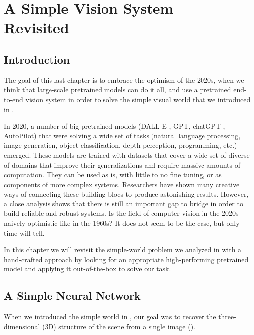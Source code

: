 %	
%	
%	 
%




\chapter{A Simple Vision System---Revisited}
\label{chap:simple_system_revisited}
\section{Introduction}
The goal of this last chapter is to embrace the optimism of the 2020s, when we think that large-scale pretrained models can do it all, and use a pretrained end-to-end vision system in order to solve the simple visual world that we introduced in \chap{\ref{chapter:simplesystem}}.

In 2020, a number of big pretrained models (DALL-E \cite{dalle1}, GPT, chatGPT \cite{openai2023gpt4}, AutoPilot) that were solving a wide set of tasks (natural language processing, image generation, object classification, depth perception, programming, etc.) emerged. These models are trained with datasets that cover a wide set of diverse of domains that improve their generalizations and require massive amounts of computation. They can be used as is, with little to no fine tuning, or as components of more complex systems. Researchers have shown many creative ways of connecting these building blocs to produce astonishing results. However, a close analysis shows that there is still an important gap to bridge in order to build reliable and robust systems. Is the field of computer vision in the 2020s naively optimistic like in the 1960s? It does not seem to be the case, but only time will tell.

In this chapter we will revisit the simple-world problem we analyzed in \chap{\ref{chapter:simplesystem}} with a hand-crafted approach by looking for an appropriate high-performing pretrained model and applying it out-of-the-box to solve our task.

\section{A Simple Neural Network}

When we introduced the simple world in \chap{\ref{chapter:simplesystem}}, our goal was to recover the three-dimensional (3D) structure of the scene from a single image (\fig{\ref{fig:simplesystem_revisited_img1}}).

